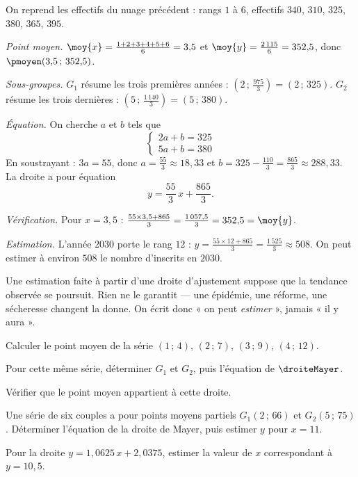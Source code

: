 \begin{exemple}
On reprend les effectifs du nuage précédent : rangs $1$ à $6$, effectifs
$340$, $310$, $325$, $380$, $365$, $395$.

\emph{Point moyen.} $\moy{x} = \frac{1+2+3+4+5+6}{6} = 3{,}5$ et
$\moy{y} = \frac{2\,115}{6} = 352{,}5$, donc
$\pmoyen(3{,}5\,;\,352{,}5)$.

\emph{Sous-groupes.} $G_{1}$ résume les trois premières années :
$\left(2\,;\,\frac{975}{3}\right) = (2\,;\,325)$. $G_{2}$ résume les trois
dernières : $\left(5\,;\,\frac{1\,140}{3}\right) = (5\,;\,380)$.

\emph{Équation.} On cherche $a$ et $b$ tels que
\[
  \begin{cases} 2a+b = 325\\ 5a+b = 380 \end{cases}
\]
En soustrayant : $3a = 55$, donc $a = \frac{55}{3} \approx 18{,}33$ et
$b = 325-\frac{110}{3} = \frac{865}{3} \approx 288{,}33$. La droite a pour
équation
\[
  y = \frac{55}{3}\,x+\frac{865}{3} .
\]

\emph{Vérification.} Pour $x = 3{,}5$ :
$\frac{55\times3{,}5+865}{3} = \frac{1\,057{,}5}{3} = 352{,}5 = \moy{y}$.
\checkmark

\emph{Estimation.} L'année $2030$ porte le rang $12$ :
$y = \frac{55\times12+865}{3} = \frac{1\,525}{3} \approx 508$. On peut
estimer à environ $508$ le nombre d'inscrits en $2030$.
\end{exemple}

\begin{avertissement}
Une estimation faite à partir d'une droite d'ajustement suppose que la
tendance observée se poursuit. Rien ne le garantit — une épidémie, une
réforme, une sécheresse changent la donne. On écrit donc « on peut
\emph{estimer} », jamais « il y aura ».
\end{avertissement}

\begin{entrainement}
\exo[\niveau{1}] Calculer le point moyen de la série
$(1\,;\,4)$, $(2\,;\,7)$, $(3\,;\,9)$, $(4\,;\,12)$.

\exo[\niveau{2}] Pour cette même série, déterminer $G_{1}$ et $G_{2}$, puis
l'équation de $\droiteMayer$.

\exo[\niveau{2}] Vérifier que le point moyen appartient à cette droite.

\exo[\niveau{3}] Une série de six couples a pour points moyens partiels
$G_{1}(2\,;\,66)$ et $G_{2}(5\,;\,75)$. Déterminer l'équation de la droite
de Mayer, puis estimer $y$ pour $x = 11$.

\exo[\niveau{3}] Pour la droite $y = 1{,}0625\,x+2{,}0375$, estimer la
valeur de $x$ correspondant à $y = 10{,}5$.
\end{entrainement}

